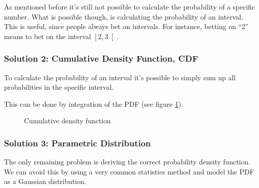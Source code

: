 As mentioned before it's still not possible to calculate the probability of a specific number. What is possible though, is calculating the probability of an interval. This is useful, since people always bet on intervals. For instance, betting on ``2'' means to bet on the interval $\left[2,3\right[$.

\subsubsection[Cumulative Density Function (CDF)]{Solution 2: Cumulative Density Function, CDF}
To calculate the probability of an interval it's possible to simply sum up all probabilities in the specific interval.

This can be done by integration of the PDF (see figure \ref{fig:2014-05-09_pdf_to_cdf}).

\begin{figure}[!ht]
\centering
{}
\caption{Cumulative density function}
\label{fig:2014-05-09_pdf_to_cdf}
\end{figure}


\subsubsection[Parametric Gaussian Distribution]{Solution 3: Parametric Distribution}
The only remaining problem is deriving the correct probability density function. We can avoid this by using a very common statistics method and model the PDF as a Gaussian distribution.

